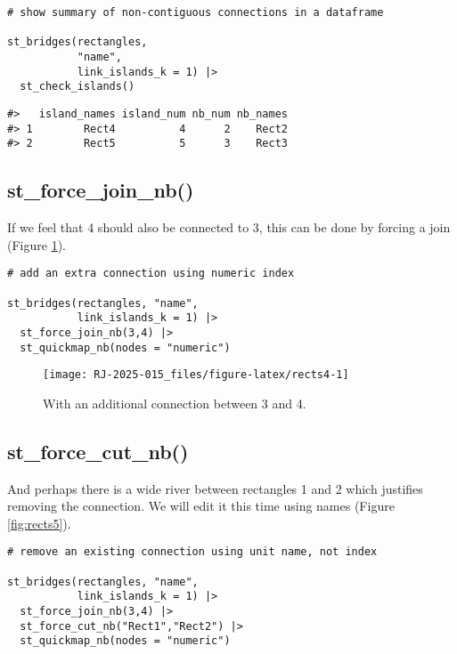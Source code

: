 \begin{verbatim}
# show summary of non-contiguous connections in a dataframe

st_bridges(rectangles,
           "name",
           link_islands_k = 1) |>
  st_check_islands()
\end{verbatim}

\begin{verbatim}
#>   island_names island_num nb_num nb_names
#> 1        Rect4          4      2    Rect2
#> 2        Rect5          5      3    Rect3
\end{verbatim}

\subsection{st\_force\_join\_nb()}\label{st_force_join_nb}

If we feel that 4 should also be connected to 3, this can be done
by forcing a join (Figure \ref{fig:rects4}).

\begin{verbatim}
# add an extra connection using numeric index

st_bridges(rectangles, "name",
           link_islands_k = 1) |>
  st_force_join_nb(3,4) |>
  st_quickmap_nb(nodes = "numeric")
\end{verbatim}

\begin{figure}

{\centering \texttt{[image: RJ-2025-015\_files/figure-latex/rects4-1]} 

}

\caption{With an additional connection between 3 and 4. }\label{fig:rects4}
\end{figure}

\subsection{st\_force\_cut\_nb()}\label{st_force_cut_nb}

And perhaps there is a wide river between rectangles 1 and 2 which
justifies removing the connection. We will edit it this time using
names (Figure \ref{fig:rects5}).

\begin{verbatim}
# remove an existing connection using unit name, not index

st_bridges(rectangles, "name",
           link_islands_k = 1) |>
  st_force_join_nb(3,4) |>
  st_force_cut_nb("Rect1","Rect2") |>
  st_quickmap_nb(nodes = "numeric")
\end{verbatim}

